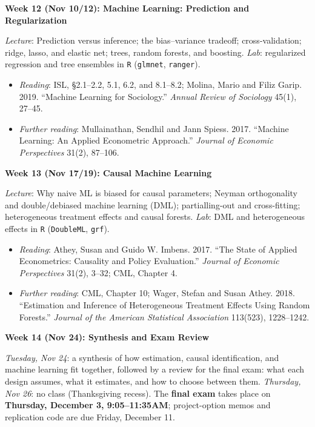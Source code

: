 \documentclass[12pt]{article}
\begin{document}
\vspace{0.8em} \noindent \textbf{\textcolor{titlecolor}{Week 12 (Nov 10/12): Machine Learning: Prediction and Regularization}}

\noindent \textit{Lecture}: Prediction versus inference; the bias--variance tradeoff; cross-validation; ridge, lasso, and elastic net; trees, random forests, and boosting. \textit{Lab}: regularized regression and tree ensembles in \texttt{R} (\texttt{glmnet}, \texttt{ranger}).
\begin{itemize}[noitemsep, topsep=2pt]
    \item \textit{Reading}: ISL, \S 2.1--2.2, 5.1, 6.2, and 8.1--8.2; Molina, Mario and Filiz Garip. 2019. ``Machine Learning for Sociology.'' \textit{Annual Review of Sociology} 45(1), 27--45.
    \item \textit{Further reading}: Mullainathan, Sendhil and Jann Spiess. 2017. ``Machine Learning: An Applied Econometric Approach.'' \textit{Journal of Economic Perspectives} 31(2), 87--106.
\end{itemize}

\vspace{0.8em} \noindent \textbf{\textcolor{titlecolor}{Week 13 (Nov 17/19): Causal Machine Learning}}

\noindent \textit{Lecture}: Why naive ML is biased for causal parameters; Neyman orthogonality and double/debiased machine learning (DML); partialling-out and cross-fitting; heterogeneous treatment effects and causal forests. \textit{Lab}: DML and heterogeneous effects in \texttt{R} (\texttt{DoubleML}, \texttt{grf}).
\begin{itemize}[noitemsep, topsep=2pt]
    \item \textit{Reading}: Athey, Susan and Guido W. Imbens. 2017. ``The State of Applied Econometrics: Causality and Policy Evaluation.'' \textit{Journal of Economic Perspectives} 31(2), 3--32; CML, Chapter 4.
    \item \textit{Further reading}: CML, Chapter 10; Wager, Stefan and Susan Athey. 2018. ``Estimation and Inference of Heterogeneous Treatment Effects Using Random Forests.'' \textit{Journal of the American Statistical Association} 113(523), 1228--1242.
\end{itemize}

\vspace{0.8em} \noindent \textbf{\textcolor{titlecolor}{Week 14 (Nov 24): Synthesis and Exam Review}}

\noindent \textit{Tuesday, Nov 24}: a synthesis of how estimation, causal identification, and machine learning fit together, followed by a review for the final exam: what each design assumes, what it estimates, and how to choose between them. \textit{Thursday, Nov 26}: no class (Thanksgiving recess). The \textbf{final exam} takes place on \textbf{Thursday, December 3, 9:05--11:35AM}; project-option memos and replication code are due Friday, December 11.
\end{document}
